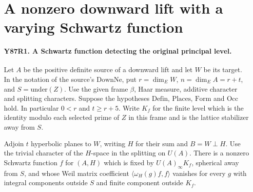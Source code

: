 \section{A nonzero downward lift with a varying Schwartz function}

\paragraph{Y87R1. A Schwartz function detecting the original principal level.}
Let $A$ be the positive definite source of a downward lift and let
$W$ be its target. In the notation of the source's $\mathrm{DownNe}$,
put $r=\dim_E W$, $n=\dim_E A=r+t$, and $S=\mathrm{under}(Z)$.
Use the given frame $\beta$, Haar measure, additive character and
splitting characters. Suppose the hypotheses $\mathrm{Defin}$,
$\mathrm{Places}$, $\mathrm{Form}$ and $\mathrm{Occ}$ hold. In
particular $0<r$ and $t\ge r+5$. Write $K_f$ for the finite level
which is the identity modulo each selected prime of $Z$ in this
frame and is the lattice stabilizer away from $S$.

Adjoin $t$ hyperbolic planes to $W$, writing $H$ for their sum and
$B=W\perp H$. Use the trivial character of the $H$-space in the
splitting on $U(A)$. There is a nonzero Schwartz function $f$ for
$(A,H)$ which is fixed by $U(A)_\infty K_f$, spherical away from
$S$, and whose Weil matrix coefficient
$\langle\omega_H(g) f,f\rangle$ vanishes for every $g$ with
integral components outside $S$ and finite component outside $K_f$.

